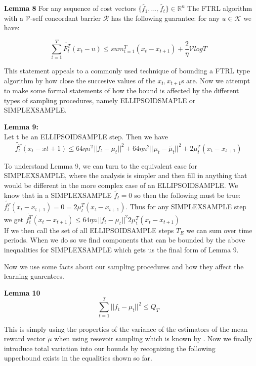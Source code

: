 \textbf{Lemma 8}
For any sequence of cost vectors $\{\tilde{f_1}, ...,\tilde{f_t}\} \in \mathbb{R}^n$
The FTRL algorithm with a $\mathcal{V}$-self concordant barrier $\mathcal{R}$ has the following
guarantee: for any $u \in \mathcal{K}$ we have:

\begin{equation}
  \sum_{t=1}^T \tilde{F_{t}^T} (x_t - u) \leq sum_{t=1}^T (x_t - x_{t+1}) + \frac{2}{\eta}\mathcal{V}  log T
\end{equation}

This statement appeals to a commonly used technique of bounding a FTRL type algorithm by how close the succesive values of the $x_t, x_{t+1}$s are. 
Now we attempt to make some formal statements of how the bound is affected by the different types of sampling procedures, namely ELLIPSOIDSMAPLE or SIMPLEXSAMPLE.

\textbf{Lemma 9:} \\
Let t be an ELLIPSOIDSAMPLE step. Then we have 
\begin{equation}
  \tilde{f_t^T}(x_t - x{t+1}) \leq 64 \eta n^2 ||f_t - \mu_t ||^2 + 64 \eta n^2 ||\mu_t -\tilde{\mu_t} ||^2 + 2 \mu_t^T (x_t - x_{t+1}) 
\end{equation} 

To understand Lemma 9, we can turn to the equivalent case for SIMPLEXSAMPLE, where the analysis
is simpler and then fill in anything that would be different in the more complex case of an ELLIPSOIDSAMPLE. We know that in a SIMPLEXSAMPLE $\tilde{f_t} = 0$ so then the following must be true: 
$\tilde{f_t^T}(x_t - x_{t+1})= 0 = 2 \mu_t^T (x_t - x_{t+1})$. Thus for any SIMPLEXSAMPLE step we get $\tilde{f_t^T}(x_t - x_{t+1}) \leq 64 \eta n ||f_t - \mu_t ||^2 2\mu_t^T (x_t - x_{t+1})$ \\

If we then call the set of all ELLIPSOIDSAMPLE steps $T_E$ we can sum over time periods. When we do so we find components that can be bounded by the above inequalities for SIMPLEXSAMPLE which gets us the final form of Lemma 9.

Now we use some facts about our sampling procedures and how they affect the learning guarentees.

\textbf{Lemma 10}
\begin{equation}
  \sum_{t=1}^T ||f_t - \mu_t||^2 \leq Q_T
\end{equation}

This is simply using the properties of the variance of the estimators of the mean reward vector $\tilde{\mu}$ when using resevoir sampling which is known by \citep{vitter}.
Now we finally introduce total variation into our bounds by recognizing the following upperbound exists in the equalities shown so far.

